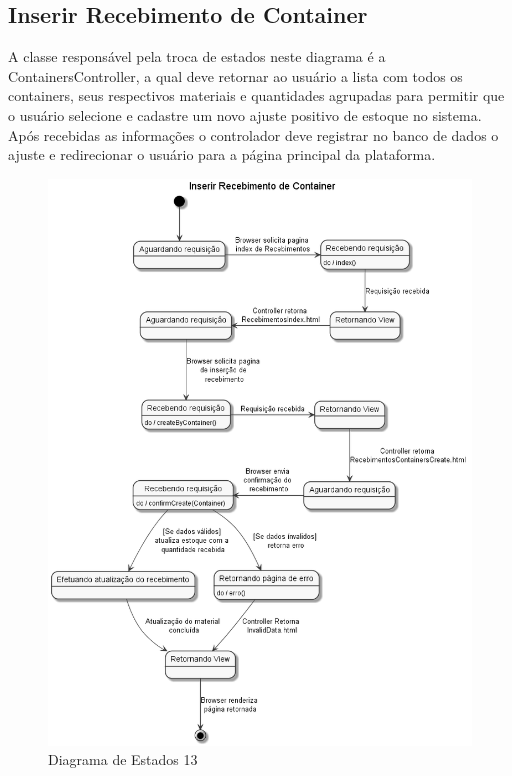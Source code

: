 \documentclass[rascunho,xindy,acronym,symbols]{fei}
\begin{document}
\subsection{Inserir Recebimento de Container}

A classe responsável pela troca de estados neste diagrama é a ContainersController, a qual deve retornar ao usuário a lista com todos os containers, seus respectivos materiais e quantidades agrupadas para permitir que o usuário selecione e cadastre um novo ajuste positivo de estoque no sistema. Após recebidas as informações o controlador deve registrar no banco de dados o ajuste e redirecionar o usuário para a página principal da plataforma.

\begin{figure}[H]
    \centering
    \includegraphics[scale=0.6, width=400pt]{./Images/DE_-_Inserir_Recebimento_de_Container.png}
    \caption{Diagrama de Estados 13}
    \label{fig:diag_est13}
\end{figure}
\end{document}
